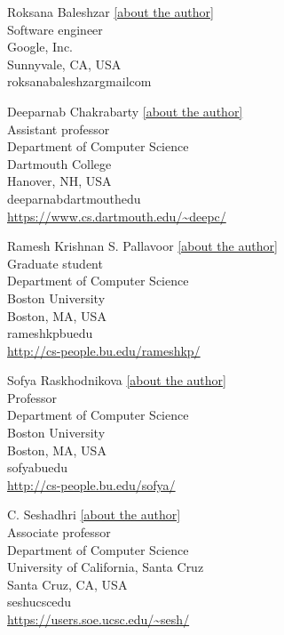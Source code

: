 \documentclass{toc}
\begin{document}
%
%
%
%
%
\begin{tocauthors}
\begin{tocinfo}[baleshzar]
  Roksana Baleshzar 
  \quad \hyperlink{baleshzarbio}{[about the author]} \\
  Software engineer\\
  Google, Inc.\\
  Sunnyvale, CA, USA\\
  roksana\tocdot{}baleshzar\tocat{}gmail\tocdot{}com
%
\end{tocinfo}
\begin{tocinfo}[chakrabarty]
 Deeparnab Chakrabarty
  \quad \hyperlink{chakrabartybio}{[about the author]} \\
 Assistant professor\\
 Department of Computer Science \\
 Dartmouth College\\
 Hanover, NH, USA\\
 deeparnab\tocat{}dartmouth\tocdot{}edu \\   %
 \url{https://www.cs.dartmouth.edu/~deepc/}      %
\end{tocinfo}
\begin{tocinfo}[pallavoor]
 Ramesh Krishnan S. Pallavoor
  \quad \hyperlink{pallavoorbio}{[about the author]} \\
 Graduate student\\
 Department of Computer Science \\
 Boston University\\
 Boston, MA, USA\\
 rameshkp\tocat{}bu\tocdot{}edu \\   %
 \url{http://cs-people.bu.edu/rameshkp/}      %
\end{tocinfo}
\begin{tocinfo}[raskhodnikova]
 Sofya Raskhodnikova
  \quad \hyperlink{raskhodnikovabio}{[about the author]} \\
 Professor\\
 Department of Computer Science \\
 Boston University\\
 Boston, MA, USA\\
 sofya\tocat{}bu\tocdot{}edu \\   %
 \url{http://cs-people.bu.edu/sofya/}      %
\end{tocinfo}
\begin{tocinfo}[seshadhri]
 C. Seshadhri
  \quad \hyperlink{seshadhribio}{[about the author]} \\
 Associate professor\\
 Department of Computer Science \\
 University of California, Santa Cruz\\
 Santa Cruz, CA, USA\\
 sesh\tocat{}ucsc\tocdot{}edu \\   %
 \url{https://users.soe.ucsc.edu/~sesh/}      %
\end{tocinfo}

\end{tocauthors}
\end{document}
